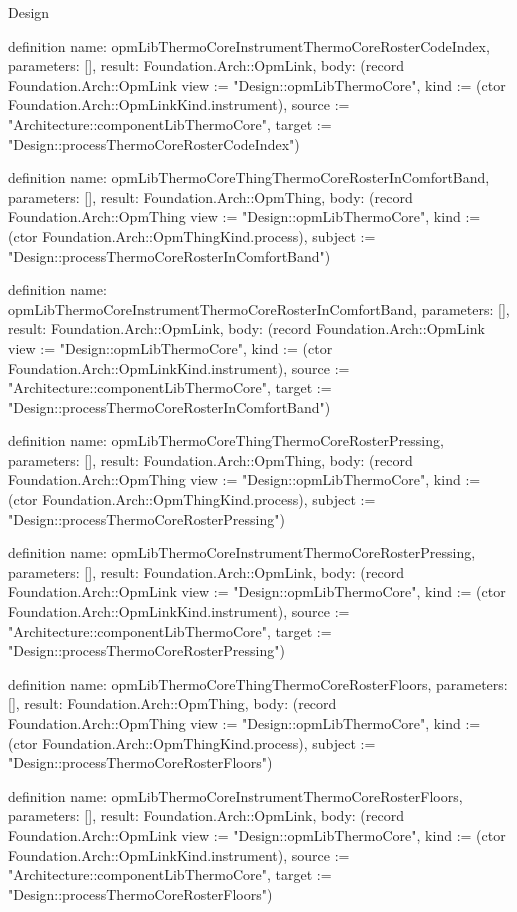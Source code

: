 \begin{lexlean}{Design}
\begin{semanticmodule}
definition{
  name: opmLibThermoCoreInstrumentThermoCoreRosterCodeIndex,
  parameters: [],
  result: Foundation.Arch::OpmLink,
  body: (record Foundation.Arch::OpmLink {view := "Design::opmLibThermoCore", kind := (ctor Foundation.Arch::OpmLinkKind.instrument), source := "Architecture::componentLibThermoCore", target := "Design::processThermoCoreRosterCodeIndex"})
}

definition{
  name: opmLibThermoCoreThingThermoCoreRosterInComfortBand,
  parameters: [],
  result: Foundation.Arch::OpmThing,
  body: (record Foundation.Arch::OpmThing {view := "Design::opmLibThermoCore", kind := (ctor Foundation.Arch::OpmThingKind.process), subject := "Design::processThermoCoreRosterInComfortBand"})
}

definition{
  name: opmLibThermoCoreInstrumentThermoCoreRosterInComfortBand,
  parameters: [],
  result: Foundation.Arch::OpmLink,
  body: (record Foundation.Arch::OpmLink {view := "Design::opmLibThermoCore", kind := (ctor Foundation.Arch::OpmLinkKind.instrument), source := "Architecture::componentLibThermoCore", target := "Design::processThermoCoreRosterInComfortBand"})
}

definition{
  name: opmLibThermoCoreThingThermoCoreRosterPressing,
  parameters: [],
  result: Foundation.Arch::OpmThing,
  body: (record Foundation.Arch::OpmThing {view := "Design::opmLibThermoCore", kind := (ctor Foundation.Arch::OpmThingKind.process), subject := "Design::processThermoCoreRosterPressing"})
}

definition{
  name: opmLibThermoCoreInstrumentThermoCoreRosterPressing,
  parameters: [],
  result: Foundation.Arch::OpmLink,
  body: (record Foundation.Arch::OpmLink {view := "Design::opmLibThermoCore", kind := (ctor Foundation.Arch::OpmLinkKind.instrument), source := "Architecture::componentLibThermoCore", target := "Design::processThermoCoreRosterPressing"})
}

definition{
  name: opmLibThermoCoreThingThermoCoreRosterFloors,
  parameters: [],
  result: Foundation.Arch::OpmThing,
  body: (record Foundation.Arch::OpmThing {view := "Design::opmLibThermoCore", kind := (ctor Foundation.Arch::OpmThingKind.process), subject := "Design::processThermoCoreRosterFloors"})
}

definition{
  name: opmLibThermoCoreInstrumentThermoCoreRosterFloors,
  parameters: [],
  result: Foundation.Arch::OpmLink,
  body: (record Foundation.Arch::OpmLink {view := "Design::opmLibThermoCore", kind := (ctor Foundation.Arch::OpmLinkKind.instrument), source := "Architecture::componentLibThermoCore", target := "Design::processThermoCoreRosterFloors"})
}


\end{semanticmodule}
\end{lexlean}
